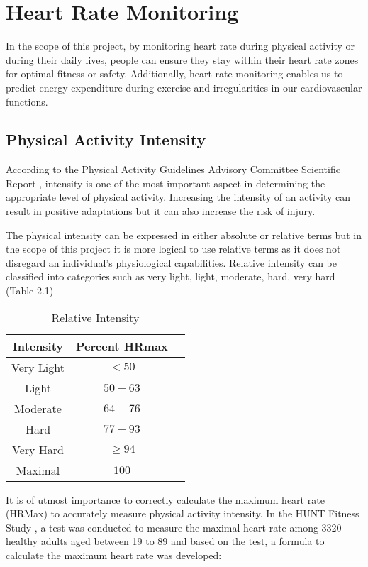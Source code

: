 \section{Heart Rate Monitoring}
In the scope of this project, by monitoring heart rate during physical activity or during their daily lives, people can ensure they stay within their heart rate zones for optimal fitness or safety.
Additionally, heart rate monitoring enables us to predict energy expenditure during exercise and irregularities in our cardiovascular functions.

\subsection{Physical Activity Intensity}
\label{chap:activity_intensity}
According to the Physical Activity Guidelines Advisory Committee Scientific Report \autocite{healthgov2008}, intensity is one of the most important aspect in determining the appropriate level of physical activity.
Increasing the intensity of an activity can result in positive adaptations but it can also increase the risk of injury. 

The physical intensity can be expressed in either absolute or relative terms but in the scope of this project it is more logical to use relative terms as it does not disregard an individual's physiological capabilities. 
Relative intensity can be classified into categories such as very light, light, moderate, hard, very hard (Table 2.1) \autocite{healthgov2008}

\begin{table}[htbp]
    \centering
    \label{tab:intensity}
    \begin{tabular}{|c|c|c|}
      \hline
      \textbf{Intensity} & \textbf{Percent HRmax} \\
      \hline
      Very Light & $<50$ \\
      Light & $50-63$ \\
      Moderate & $64-76$ \\
      Hard & $77-93$ \\
      Very Hard & $\geq94$ \\
      Maximal & $100$ \\
      \hline
    \end{tabular}
    \caption{Relative Intensity \autocite{healthgov2008}}
  \end{table}
  
It is of utmost importance to correctly calculate the maximum heart rate (HRMax) to accurately measure physical activity intensity. In the HUNT Fitness Study \autocite{nes2013maximal}, a test was conducted to measure the maximal heart rate among 3320 healthy adults aged between 19 to 89 and based on the test, a formula to calculate the maximum heart rate was developed: 

